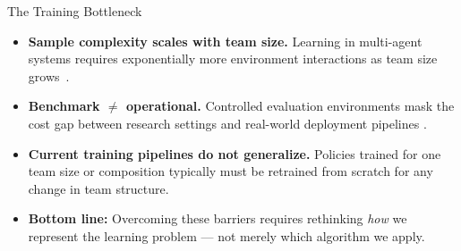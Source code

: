 \begin{frame}{The Training Bottleneck}
    \begin{itemize}
        \item \textbf{Sample complexity scales with team size.}
            Learning in multi-agent systems requires exponentially more
            environment interactions as team size grows~\cite{jin2025,canese2021}.

        \item \textbf{Benchmark $\neq$ operational.}
            Controlled evaluation environments mask the cost gap between
            research settings and real-world deployment pipelines
            \cite{gronauer2022,krouka2022}.

        \item \textbf{Current training pipelines do not generalize.}
            Policies trained for one team size or composition
            typically must be retrained from scratch for any
            change in team structure.

        \item \textbf{Bottom line:} Overcoming these barriers requires
            rethinking \emph{how} we represent the learning problem —
            not merely which algorithm we apply.
    \end{itemize}

\end{frame}

